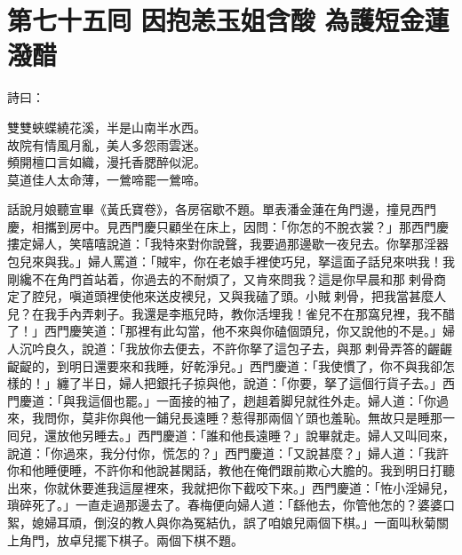 
\chapter*{第七十五囘 因抱恙玉姐含酸 為護短金蓮潑醋}


詩曰：

\begin{myquote} 
雙雙蛺蝶繞花溪，半是山南半水西。\\故院有情風月亂，美人多怨雨雲迷。\\頻開檀口言如織，漫托香腮醉似泥。\\莫道佳人太命薄，一鶯啼罷一鶯啼。
\end{myquote} 

話說月娘聽宣畢《黃氏寶卷》，各房宿歇不題。單表潘金蓮在角門邊，撞見西門慶，相攜到房中。見西門慶只顧坐在床上，{}因問：「你怎的不脫衣裳？」那西門慶摟定婦人，笑嘻嘻說道：「我特來對你說聲，我要過那邊歇一夜兒去。你拏那淫器包兒來與我。」婦人罵道：「賊牢，你在老娘手裡使巧兒，拏這面子話兒來哄我！{}我剛纔不在角門首站着，你過去的不耐煩了，又肯來問我？這是你早晨和那𢱉剌骨商定了腔兒，嗔道頭裡使他來送皮襖兒，又與我磕了頭。小賊𢱉剌骨，把我當甚麼人兒？在我手內弄剌子。我還是李瓶兒時，教你活埋我！{}雀兒不在那窩兒裡，我不醋了！」{}西門慶笑道：「那裡有此勾當，他不來與你磕個頭兒，你又說他的不是。」婦人沉吟良久，說道：「我放你去便去，{}不許你拏了這包子去，{}與那𢱉剌骨弄答的齷齷齪齪的，到明日還要來和我睡，好乾淨兒。」{}西門慶道：「我使慣了，你不與我卻怎樣的！」纏了半日，婦人把銀托子掠與他，說道：「你要，拏了這個行貨子去。」西門慶道：「與我這個也罷。」一面接的袖了，趔趄着脚兒就徃外走。婦人道：「你過來，我問你，莫非你與他一鋪兒長遠睡？惹得那兩個丫頭也羞恥。無故只是睡那一囘兒，還放他另睡去。」西門慶道：「誰和他長遠睡？」說畢就走。婦人又叫囘來，說道：「你過來，我分付你，慌怎的？」{}西門慶道：「又說甚麼？」婦人道：「我許你和他睡便睡，不許你和他說甚閑話，教他在俺們跟前欺心大膽的。我到明日打聽出來，你就休要進我這屋裡來，我就把你下截咬下來。」{}西門慶道：「恠小淫婦兒，瑣碎死了。」一直走過那邊去了。春梅便向婦人道：「繇他去，你管他怎的？婆婆口絮，媳婦耳頑，倒沒的教人與你為冤結仇，{}誤了咱娘兒兩個下棋。」一面叫秋菊關上角門，放卓兒擺下棋子。兩個下棋不題。

